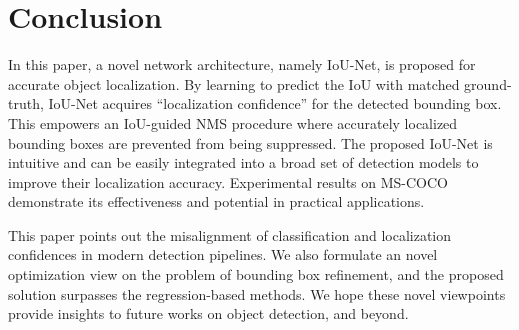 \documentclass[runningheads]{llncs}
\begin{document}
\section{Conclusion}
In this paper, a novel network architecture, namely IoU-Net, is proposed for accurate object localization. By learning to predict the IoU with matched ground-truth, IoU-Net acquires ``localization confidence'' for the detected bounding box. This empowers an IoU-guided NMS procedure where accurately localized bounding boxes are prevented from being suppressed.
The proposed IoU-Net is intuitive and can be easily integrated into a broad set of detection models to improve their localization accuracy. Experimental results on MS-COCO demonstrate its effectiveness and potential in practical applications.

This paper points out the misalignment of classification and localization confidences in modern detection pipelines.
We also formulate an novel optimization view on the problem of bounding box refinement, and the proposed solution surpasses the regression-based methods.
We hope these novel viewpoints provide insights to future works on object detection, and beyond.



\end{document}
